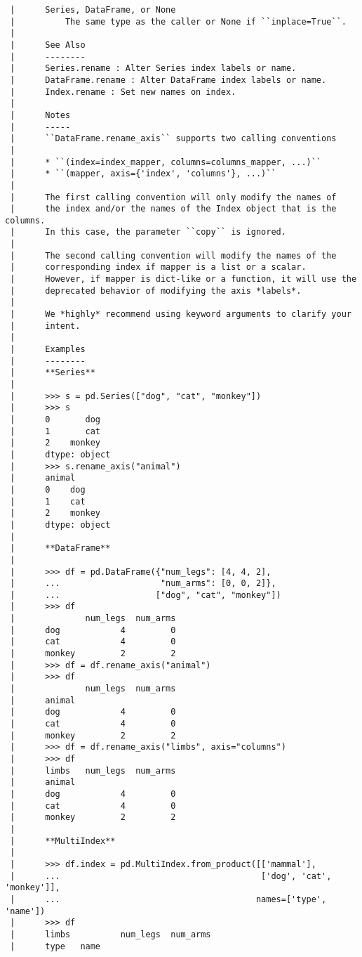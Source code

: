 \documentclass[
  letterpaper,
  DIV=11,
  numbers=noendperiod]{scrreprt}
\begin{document}
\begin{verbatim}
 |      Series, DataFrame, or None
 |          The same type as the caller or None if ``inplace=True``.
 |      
 |      See Also
 |      --------
 |      Series.rename : Alter Series index labels or name.
 |      DataFrame.rename : Alter DataFrame index labels or name.
 |      Index.rename : Set new names on index.
 |      
 |      Notes
 |      -----
 |      ``DataFrame.rename_axis`` supports two calling conventions
 |      
 |      * ``(index=index_mapper, columns=columns_mapper, ...)``
 |      * ``(mapper, axis={'index', 'columns'}, ...)``
 |      
 |      The first calling convention will only modify the names of
 |      the index and/or the names of the Index object that is the columns.
 |      In this case, the parameter ``copy`` is ignored.
 |      
 |      The second calling convention will modify the names of the
 |      corresponding index if mapper is a list or a scalar.
 |      However, if mapper is dict-like or a function, it will use the
 |      deprecated behavior of modifying the axis *labels*.
 |      
 |      We *highly* recommend using keyword arguments to clarify your
 |      intent.
 |      
 |      Examples
 |      --------
 |      **Series**
 |      
 |      >>> s = pd.Series(["dog", "cat", "monkey"])
 |      >>> s
 |      0       dog
 |      1       cat
 |      2    monkey
 |      dtype: object
 |      >>> s.rename_axis("animal")
 |      animal
 |      0    dog
 |      1    cat
 |      2    monkey
 |      dtype: object
 |      
 |      **DataFrame**
 |      
 |      >>> df = pd.DataFrame({"num_legs": [4, 4, 2],
 |      ...                    "num_arms": [0, 0, 2]},
 |      ...                   ["dog", "cat", "monkey"])
 |      >>> df
 |              num_legs  num_arms
 |      dog            4         0
 |      cat            4         0
 |      monkey         2         2
 |      >>> df = df.rename_axis("animal")
 |      >>> df
 |              num_legs  num_arms
 |      animal
 |      dog            4         0
 |      cat            4         0
 |      monkey         2         2
 |      >>> df = df.rename_axis("limbs", axis="columns")
 |      >>> df
 |      limbs   num_legs  num_arms
 |      animal
 |      dog            4         0
 |      cat            4         0
 |      monkey         2         2
 |      
 |      **MultiIndex**
 |      
 |      >>> df.index = pd.MultiIndex.from_product([['mammal'],
 |      ...                                        ['dog', 'cat', 'monkey']],
 |      ...                                       names=['type', 'name'])
 |      >>> df
 |      limbs          num_legs  num_arms
 |      type   name

\end{verbatim}
\end{document}
